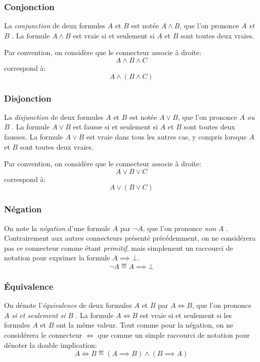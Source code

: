 \subsubsection{Conjonction}

La \textit{conjunction} de deux formules $A$ et $B$ est notée $A \wedge B$, que l'on prononce \og $A$ \textit{et} $B$ \fg{}.
La formule $A \wedge B$ est vraie si et seulement si $A$ et $B$ sont toutes deux vraies.

Par convention, on considère que le connecteur associe à droite:
\[
A \wedge B \wedge C
\]
correspond à:
\[
A \wedge (B \wedge C)
\]


\subsubsection{Disjonction}

La \textit{disjunction} de deux formules $A$ et $B$ est notée $A \vee B$, que l'on prononce \og $A$ \textit{ou} $B$ \fg{}.
La formule $A \vee B$ est fausse si et seulement si $A$ et $B$ sont toutes deux fausses.
La formule $A \vee B$ est vraie dans tous les autres cas, y compris lorsque $A$ et $B$ sont toutes deux vraies.

Par convention, on considère que le connecteur associe à droite:
\[
A \vee B \vee C
\]
correspond à:
\[
A \vee (B \vee C)
\]

\subsubsection{Négation}

On note la \textit{négation} d'une formule $A$ par $\neg A$, que l'on prononce \og \textit{non} $A$ \fg{}. Contrairement aux autres connecteurs présenté précédemment, on ne considérera pas ce connecteur comme étant \textit{primitif}, mais simplement un raccourci de notation pour exprimer la formule $A \implies \bot$.
\[
\neg A \eqdef A \implies \bot
\]

\subsubsection{Équivalence}

On dénote l'\textit{équivalence} de deux formules $A$ et $B$ par $A \iff B$, que l'on prononce \og $A$ \textit{si et seulement si} $B$ \fg{}. La formule $A \iff B$ est vraie si et seulement si les formules $A$ et $B$ ont la même valeur. Tout comme pour la négation, on ne considérera le connecteur ${\iff}$ que comme un simple raccourci de notation pour dénoter la double implication:
\[
A \iff B \eqdef (A \implies B) \wedge (B \implies A)
\]

